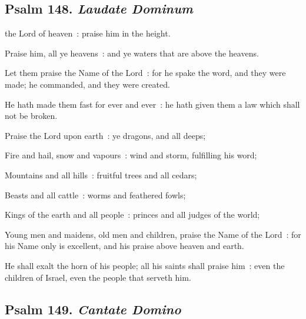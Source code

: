 \subsection{Psalm 148. \textit{Laudate Dominum}}

 the Lord of heaven~: praise him in the height.\par
{}
Praise him, all ye heavens~: and ye waters that are above the heavens.\par
{}Let them praise the Name of the Lord~: for he spake the word, and they were made; he commanded, and they were created.\par
{}He hath made them fast for ever and ever~: he hath given them a law which shall not be broken.\par
{}Praise the Lord upon earth~: ye dragons, and all deeps;\par
{}Fire and hail, snow and vapours~: wind and storm, fulfilling his word;\par
{}Mountains and all hills~: fruitful trees and all cedars;\par
{}Beasts and all cattle~: worms and feathered fowls;\par
{}Kings of the earth and all people~: princes and all judges of the world;\par
{}Young men and maidens, old men and children, praise the Name of the Lord~: for his Name only is excellent, and his praise above heaven and earth.\par
{}He shall exalt the horn of his people; all his saints shall praise him~: even the children of Israel, even the people that serveth him.\par

\subsection{Psalm 149. \textit{Cantate Domino}}


